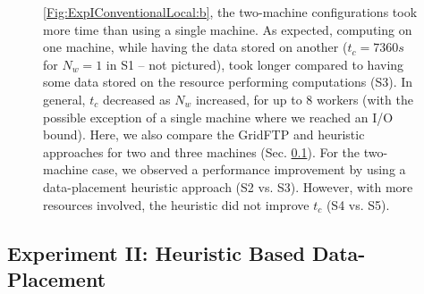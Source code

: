 \documentclass{rspublic}
\newcommand{\fixme}[1]{ { \bf{ ***FIXME: #1
}} } \newcommand{\jhanote}[1]{ {\textcolor{red} { ***Jha: #1 }}}
\newcommand{\micnote}[1]{ {\textcolor{blue} { ***Michael: #1 }}}
\newcommand{\betynote}[1]{ {\textcolor{orange} { ***Bety: #1 }}}
\newcommand{\jhanote}[1]{} \newcommand{\micnote}[1]{}\newcommand{\betynote}[1]{} \newcommand{\fixme}[1]{}
\begin{document}
\begin{figure}[!ht]
\begin{center}
{  \ref{Fig:ExpIConventionalLocal:b}, the two-machine configurations
  took more time than using a single machine. As expected, computing
  on one machine, while having the data stored on another ($t_c=7360s$
  for $N_w=1$ in S1 -- not pictured), took longer compared to having
  some data stored on the resource performing computations (S3). In
  general, $t_c$ decreased as $N_w$ increased, for up to 8 workers
  (with the possible exception of a single machine where we reached an
  I/O bound). Here, we also compare the GridFTP and heuristic
  approaches for two and three machines
  (Sec. \ref{Sec:Heuristic}). For the two-machine case, we observed a
  performance improvement by using a data-placement heuristic approach
  (S2 vs. S3). However, with more resources involved, the heuristic
  did not improve $t_c$ (S4 vs. S5).}
\label{Fig:ExpIConventionalLocal}
\end{center}
\vspace{-0.3cm}
\end{figure}





\vspace{-0.4cm}

\subsection{Experiment II: Heuristic Based Data-Placement}\label{Sec:Heuristic}

\vspace{-0.1cm}
\end{document}
